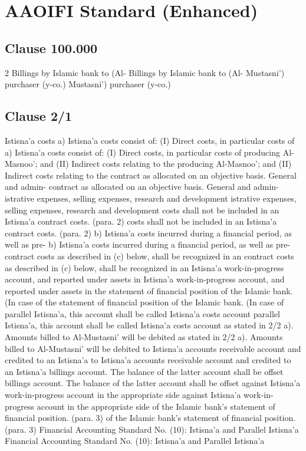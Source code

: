 \documentclass{article}%
\begin{document}
%
\normalsize%
\section{AAOIFI Standard (Enhanced)}%
\label{sec:AAOIFIStandard(Enhanced)}%
\subsection{Clause 100.000}%
\label{subsec:Clause100.000}%
2 Billings by Islamic bank to (Al- Billings by Islamic bank to (Al- Mustasni’) purchaser (y-co.) Mustasni’) purchaser (y-co.)

%
\subsection{Clause 2/1}%
\label{subsec:Clause2/1}%
Istisna’a costs a) Istisna’a costs consist of: (I) Direct costs, in particular costs of  a) Istisna’a costs consist of: (I) Direct costs, in particular costs of  producing Al-Masnoo’; and (II) Indirect costs relating to the  producing Al-Masnoo’; and (II) Indirect costs relating to the  contract as allocated on an objective basis. General and admin- contract as allocated on an objective basis. General and admin- istrative expenses, selling expenses, research and development  istrative expenses, selling expenses, research and development  costs shall not be included in an Istisna’a contract costs. (para. 2) costs shall not be included in an Istisna’a contract costs. (para. 2) b) Istisna’a costs incurred during a financial period, as well as pre- b) Istisna’a costs incurred during a financial period, as well as pre- contract costs as described in (c) below, shall be recognized in an  contract costs as described in (c) below, shall be recognized in an  Istisna’a work-in-progress account, and reported under assets in  Istisna’a work-in-progress account, and reported under assets in  the statement of financial position of the Islamic bank. (In case of  the statement of financial position of the Islamic bank. (In case of  parallel Istisna’a, this account shall be called Istisna’a costs account  parallel Istisna’a, this account shall be called Istisna’a costs account  as stated in 2/2 a). Amounts billed to Al-Mustasni’ will be debited  as stated in 2/2 a). Amounts billed to Al-Mustasni’ will be debited  to Istisna’a accounts receivable account and credited to an Istisna’a  to Istisna’a accounts receivable account and credited to an Istisna’a  billings account. The balance of the latter account shall be offset  billings account. The balance of the latter account shall be offset  against Istisna’a work-in-progress account in the appropriate side  against Istisna’a work-in-progress account in the appropriate side  of the Islamic bank’s statement of financial position. (para. 3) of the Islamic bank’s statement of financial position. (para. 3) Financial Accounting Standard No. (10): Istisna’a and Parallel Istisna’a Financial Accounting Standard No. (10): Istisna’a and Parallel Istisna’a
\end{document}
